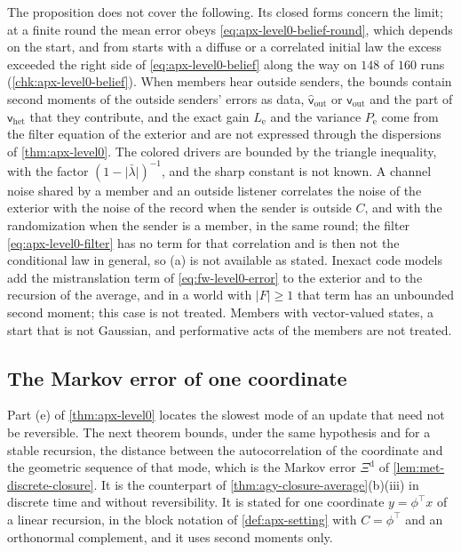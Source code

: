 The proposition does not cover the following. Its closed forms concern the limit; at a finite round the mean error obeys \eqref{eq:apx-level0-belief-round}, which depends on the start, and from starts with a diffuse or a correlated initial law the excess exceeded the right side of \eqref{eq:apx-level0-belief} along the way on $148$ of $160$ runs (\cref{chk:apx-level0-belief}). When members hear outside senders, the bounds contain second moments of the outside senders' errors as data, $\hat{\mathsf v}_{\mathrm{out}}$ or $\mathsf v_{\mathrm{out}}$ and the part of $\mathsf v_{\mathrm{het}}$ that they contribute, and the exact gain $L_{\mathrm e}$ and the variance $P_{\mathrm e}$ come from the filter equation of the exterior and are not expressed through the dispersions of \cref{thm:apx-level0}. The colored drivers are bounded by the triangle inequality, with the factor $(1-\lvert\bar\lambda\rvert)^{-1}$, and the sharp constant is not known. A channel noise shared by a member and an outside listener correlates the noise of the exterior with the noise of the record when the sender is outside $C$, and with the randomization when the sender is a member, in the same round; the filter \eqref{eq:apx-level0-filter} has no term for that correlation and is then not the conditional law in general, so (a) is not available as stated. Inexact code models add the mistranslation term of \eqref{eq:fw-level0-error} to the exterior and to the recursion of the average, and in a world with $\lvert F\rvert\ge1$ that term has an unbounded second moment; this case is not treated. Members with vector-valued states, a start that is not Gaussian, and performative acts of the members are not treated.

\subsection{The Markov error of one coordinate}\label{sec:apx-markov}

Part (e) of \cref{thm:apx-level0} locates the slowest mode of an update that need not be reversible. The next theorem bounds, under the same hypothesis and for a stable recursion, the distance between the autocorrelation of the coordinate and the geometric sequence of that mode, which is the Markov error $\Xi^{\mathrm d}$ of \cref{lem:met-discrete-closure}. It is the counterpart of \cref{thm:agy-closure-average}(b)(iii) in discrete time and without reversibility. It is stated for one coordinate $y=\phi^\top x$ of a linear recursion, in the block notation of \cref{def:apx-setting} with $C=\phi^\top$ and an orthonormal complement, and it uses second moments only.

